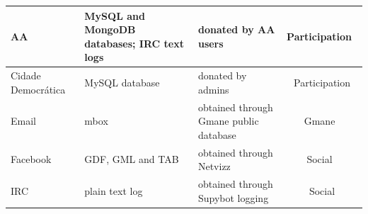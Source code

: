 \begin{table}[h!]
\begin{center}
\begin{tabular}{| l || p{3cm} | p{3cm} | c |}
																																																																																																																																																																																																																																																																																																																																																																																																																												AA & MySQL and MongoDB databases; IRC text logs & donated by AA users & Participation~\cite{participation} \\\hline
																																																																																																																																																																																																																																																																																																																																																																																																																															Cidade Democrática & MySQL database & donated by admins & Participation \\\hline
																																																																																																																																																																																																																																																																																																																																																																																																																																		Email & mbox & obtained through Gmane public database & Gmane~\cite{gmane} \\\hline
																																																																																																																																																																																																																																																																																																																																																																																																																																					Facebook & GDF, GML and TAB & obtained through Netvizz~\cite{netvizz} & Social~\cite{social} \\\hline
																																																																																																																																																																																																																																																																																																																																																																																																																																								IRC & plain text log & obtained through Supybot logging & Social \\\hline

\end{tabular}
\end{center}
\end{table}

